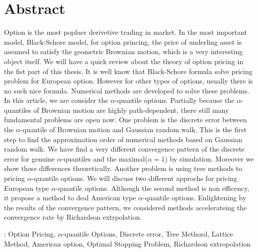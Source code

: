 \chapter{Abstract}
Option is the most popluer derivetive trading in market. 
In the most important model, Black-Schore model, for option princing, 
the price of underling asset is assumed to 
satisfy the geometric Brownian motion, 
which is a very interesting object itself. 
We will have a quick review about the theory of option pricing
in the fist part of this thesis.
It is well know that Black-Schore formula solve pricing problem 
for European option.
However for other types of options, usually there is no such nice formula. 
Numerical methods are developed to solve these problems. 
In this article, we are consider the $\alpha$-quantile options. 
Partially because the $\alpha$-quantiles of Brownian motion 
are highly path-dependent, 
there still many fundamental problems are open now.
One problem is the discrete error between the $\alpha$-quantile 
of Brownian motion and Gaussian random walk. 
This is the first step to find the approximation order of numerical 
methods based on Gaussian random walk.
We have find a very different 
convergence pattern of the discrete error for genuine $\alpha$-quantiles
and the maximal($\alpha=1$) by simulation. 
Moreover we show these differences theoretically.
Another problem is using tree methods to pricing 
$\alpha$-quantile options. We will discuss two different approchs for pricing
European type $\alpha$-quantile options.
Although the second method is non efficency, 
it propose a method to deal American type $\alpha$-quantile options. 
Enlightening by the results of the convergence pattern,
we considered methods accelerateing the convergence rate by Richardson extrpolation.  
\vspace{1cm}

: Option Pricing, $\alpha$-quantile Options, Discrete error, Tree Methord, Lattice Method, American option, Optimal Stopping Problem, Richardson extropolation
